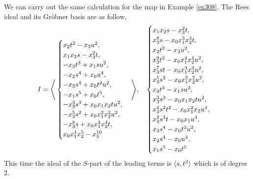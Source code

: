 \documentclass[fleqn,reqno]{amsart}
\begin{document}
\begin{example}[$\mt{ex314}$]
We can carry out the same calculation for the map in Example \ref{ex308}.
The Rees ideal and its Gr\"obner basis are as follow,
\[
	I=\Bigg\langle\begin{cases}
	{x}_{2} t^{2}-{x}_{3} u^{2},\\{x}_{1} {x}_{2} s-{x}_{3}^{2} t,\\-{x}_{3}
	     t^{3}+{x}_{1} s u^{2},\\-{x}_{2} s^{4}+{x}_{0} u^{4},\\-{x}_{3} s^{4}+{x}_{0} t^{2}
	     u^{2},\\-{x}_{1} s^{5}+{x}_{0} t^{5},\\-{x}_{3}^{3} s^{3}+{x}_{0} {x}_{1} {x}_{2} t
	     u^{2},\\-{x}_{3}^{5} s^{2}+{x}_{0} {x}_{1}^{2} {x}_{2}^{2} u^{2},\\-{x}_{3}^{8}
	     s+{x}_{0} {x}_{1}^{3} {x}_{2}^{4} t,\\{x}_{0} {x}_{1}^{4}
	     {x}_{2}^{5}-{x}_{3}^{10}
	\end{cases}\Bigg\rangle,
	\quad
	\begin{cases}
		{x}_{1} {x}_{2} s-{x}_{3}^{2}
		      t,\\{x}_{3}^{8} s-{x}_{0} {x}_{1}^{3} {x}_{2}^{4} t,\\{x}_{2} t^{2}-{x}_{3}
		      u^{2},\\{x}_{3}^{9} t^{2}-{x}_{0} {x}_{1}^{4} {x}_{2}^{4} u^{2},\\{x}_{3}^{7} s
		      t-{x}_{0} {x}_{1}^{3} {x}_{2}^{3} u^{2},\\{x}_{3}^{5} s^{2}-{x}_{0} {x}_{1}^{2}
		      {x}_{2}^{2} u^{2},\\{x}_{3} t^{3}-{x}_{1} s u^{2},\\{x}_{3}^{3} s^{3}-{x}_{0}
		      {x}_{1} {x}_{2} t u^{2},\\{x}_{3}^{4} s^{2} t^{2}-{x}_{0} {x}_{1}^{2} {x}_{2}
		      u^{4},\\{x}_{3}^{2} s^{3} t-{x}_{0} {x}_{1} u^{4},\\{x}_{3} s^{4}-{x}_{0} t^{2}
		      u^{2},\\{x}_{2} s^{4}-{x}_{0} u^{4},\\{x}_{1} s^{5}-{x}_{0} t^{5}
	\end{cases}
\]
This time the ideal of the $S$-part of the leading terms is $\langle s,t^2\rangle$ which is of degree 2.
\end{example}
\end{document}
